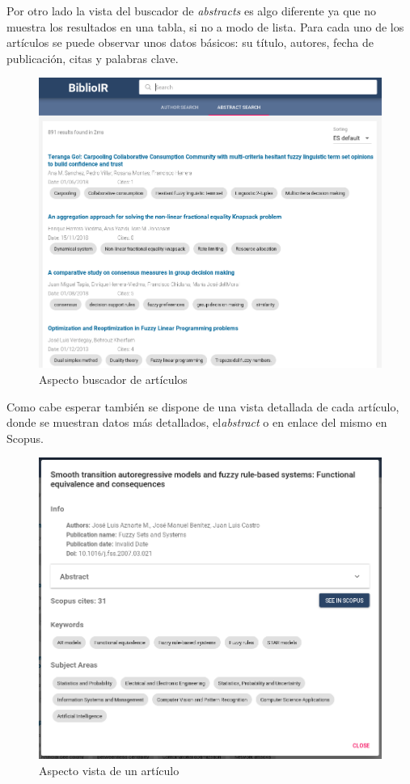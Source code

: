 \newpage

Por otro lado la vista del buscador de \textit{abstracts} es algo diferente ya que no muestra los resultados en una tabla, si no a modo de lista. Para cada uno de los artículos se puede observar unos datos básicos: su título, autores, fecha de publicación, citas y palabras clave.

\begin{figure}[h]
	
	\centering
	\includegraphics[width=\linewidth]{imagenes/AspectoBuscadorAbstracts}
	\caption{Aspecto buscador de artículos}
\end{figure}

\newpage

Como cabe esperar también se dispone de una vista detallada de cada artículo, donde se muestran datos más detallados, el\textit{abstract} o en enlace del mismo en Scopus.
\begin{figure}[h]
	
	\centering
	\includegraphics[width=\linewidth]{imagenes/AspectoVistaAbstract}
	\caption{Aspecto vista de un artículo}
\end{figure}

